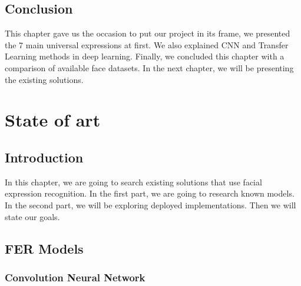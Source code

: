 \documentclass[12pt,a4paper,oneside,english]{book}
\begin{document}
\section*{Conclusion}
This chapter gave us the occasion to put our project in its frame, we presented the 7 main universal expressions at first. We also explained CNN and Transfer Learning methods in deep learning. Finally, we concluded this chapter with a comparison of available face datasets.
In the next chapter, we will be presenting the existing solutions.

\chapter{State of art}
\label{ch:2eme}
\minitoc
\newpage
\section*{Introduction}
In this chapter, we are going to search existing solutions that use facial expression recognition.
In the first part, we are going to research known models. In the second part, we will be exploring deployed implementations. Then we will state our goals.
\section{FER Models}
\subsection{Convolution Neural Network}
\end{document}
